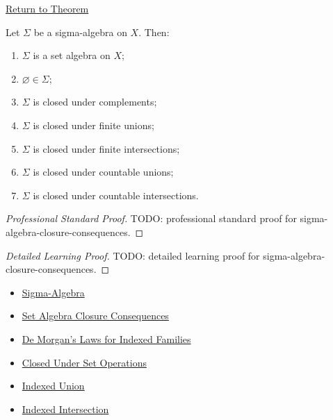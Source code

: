 \newpage
{}
\label{prf:sigma-algebra-closure-consequences}

\begin{remark*}[Return]
\hyperref[thm:sigma-algebra-closure-consequences]{Return to Theorem}
\end{remark*}

\begin{theorem*}
Let \(\Sigma\) be a sigma-algebra on \(X\).  Then:
\begin{enumerate}[label=(\roman*)]
\item \(\Sigma\) is a set algebra on \(X\);
\item \(\varnothing\in\Sigma\);
\item \(\Sigma\) is closed under complements;
\item \(\Sigma\) is closed under finite unions;
\item \(\Sigma\) is closed under finite intersections;
\item \(\Sigma\) is closed under countable unions;
\item \(\Sigma\) is closed under countable intersections.
\end{enumerate}
\end{theorem*}

\begin{proof}[Professional Standard Proof]
\LRAProofBodyStart
TODO: professional standard proof for sigma-algebra-closure-consequences.
\end{proof}

\begin{proof}[Detailed Learning Proof]
\LRAProofBodyStart
TODO: detailed learning proof for sigma-algebra-closure-consequences.
\end{proof}

\begin{remark*}
\end{remark*}

\begin{dependencies}
\begin{itemize}
  \item \hyperref[def:sigma-algebra]{Sigma-Algebra}
  \item \hyperref[thm:set-algebra-closure-consequences]{Set Algebra Closure Consequences}
  \item \hyperref[thm:indexed-de-morgan]{De Morgan's Laws for Indexed Families}
  \item \hyperref[def:closed-under-set-operation-vocabulary]{Closed Under Set Operations}
  \item \hyperref[def:indexed-union]{Indexed Union}
  \item \hyperref[def:indexed-intersection]{Indexed Intersection}
\end{itemize}
\end{dependencies}

\clearpage
